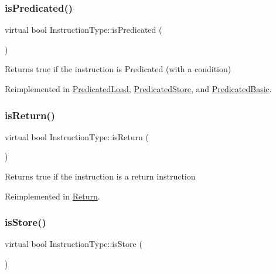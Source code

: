 \subsubsection{\texorpdfstring{is\+Predicated()}{isPredicated()}}
{\footnotesize\ttfamily virtual bool Instruction\+Type\+::is\+Predicated (\begin{DoxyParamCaption}{ }\end{DoxyParamCaption})\hspace{0.3cm}{\ttfamily [virtual]}}

Returns true if the instruction is Predicated (with a condition) 

Reimplemented in \hyperlink{classPredicatedLoad_aebf98efc7d6d09ec1d8f9c578a65e156}{Predicated\+Load}, \hyperlink{classPredicatedStore_a204c4cac7241d1d1b61719c5fcbc6512}{Predicated\+Store}, and \hyperlink{classPredicatedBasic_aa63e9f18308f45cc3f74e27d9db3ef29}{Predicated\+Basic}.

\mbox{\label{classInstructionType_a15b0f034f3536f0bc525550406e1d7c6}} 
\subsubsection{\texorpdfstring{is\+Return()}{isReturn()}}
{\footnotesize\ttfamily virtual bool Instruction\+Type\+::is\+Return (\begin{DoxyParamCaption}{ }\end{DoxyParamCaption})\hspace{0.3cm}{\ttfamily [virtual]}}

Returns true if the instruction is a return instruction 

Reimplemented in \hyperlink{classReturn_ad3412361560f4acdb1e4f73ab65d3bc7}{Return}.

\mbox{\label{classInstructionType_aa81de3619fb9d88f52d7d8104f9ac188}} 
\subsubsection{\texorpdfstring{is\+Store()}{isStore()}}
{\footnotesize\ttfamily virtual bool Instruction\+Type\+::is\+Store (\begin{DoxyParamCaption}{ }\end{DoxyParamCaption})\hspace{0.3cm}{\ttfamily [virtual]}}

